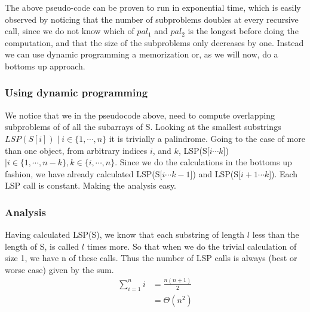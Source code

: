\documentclass[11pt,english]{article}
\begin{document}
\noindent
The above pseudo-code can be proven to run in exponential time, which is
easily observed by noticing that the number of subproblems doubles at every
recursive call, since we do not know which of $pal_1$ and $pal_2$ is the
longest before doing the computation, and that the size of the subproblems
only decreases by one. Instead we can use dynamic programming a memorization
or, as we will now, do a bottoms up approach.

\subsubsection*{Using dynamic programming}
We notice that we in the pseudocode above, need to compute overlapping
subproblems of of all the subarrays of S. Looking at the smallest substrings
$LSP(S[i]) \mid i \in \{1,\cdots, n\}$ it is trivially a palindrome. Going to
the case of more than one object, from arbitrary indices $i$, and $k$, LSP(S[$i \cdots k$])
$\mid i \in \{1, \cdots, n-k\}, k \in \{ i, \cdots, n \}$. Since we do the
calculations in the bottoms up fashion, we have already calculated
LSP(S[$i \cdots k-1$]) and LSP(S[$i+1 \cdots k$]). Each LSP call is constant.
Making the analysis easy.

\subsubsection*{Analysis}
Having calculated LSP(S), we know that each substring of length $l$ less than
the length of S, is called $l$ times more. So that when we do the trivial
calculation of size 1, we have n of these calls. Thus the number of LSP calls
is always (best or worse case) given by the sum.
\begin{align*}
\sum_{i = 1}^n i &= \frac{n(n+1)}{2} \\
&= \Theta(n^2)
\end{align*}







\end{document}

